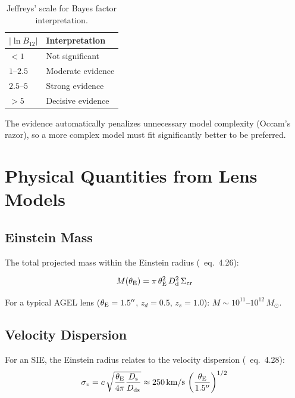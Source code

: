 \documentclass[11pt, letterpaper]{article}
\begin{document}
\begin{table}[H]
\centering
\begin{tabular}{ll}
\toprule
$|\ln B_{12}|$ & Interpretation \\
\midrule
$< 1$ & Not significant \\
$1$--$2.5$ & Moderate evidence \\
$2.5$--$5$ & Strong evidence \\
$> 5$ & Decisive evidence \\
\bottomrule
\end{tabular}
\caption{Jeffreys' scale for Bayes factor interpretation.}
\end{table}

The evidence automatically penalizes unnecessary model complexity
(Occam's razor), so a more complex model must fit significantly better
to be preferred.

\section{Physical Quantities from Lens Models}

\subsection{Einstein Mass}

The total projected mass within the Einstein radius (\CK\ eq.~4.26):
\begin{keyresult}
\begin{equation}
M(\theta_{\rm E}) = \pi\,\theta_{\rm E}^2\,D_{\rm d}^2\,\Sigma_{\rm cr}
\label{eq:einstein-mass}
\end{equation}
\end{keyresult}

For a typical AGEL lens ($\theta_{\rm E} = 1.5''$, $z_d = 0.5$, $z_s = 1.0$):
$M \sim 10^{11}$--$10^{12}\,M_\odot$.

\subsection{Velocity Dispersion}

For an SIE, the Einstein radius relates to the velocity dispersion
(\CK\ eq.~4.28):
\begin{equation}
\sigma_v = c\,\sqrt{\frac{\theta_{\rm E}}{4\pi} \frac{D_{\rm s}}{D_{\rm ds}}}
\approx 250\,\text{km/s}\,\left(\frac{\theta_{\rm E}}{1.5''}\right)^{1/2}
\end{equation}
\end{document}
